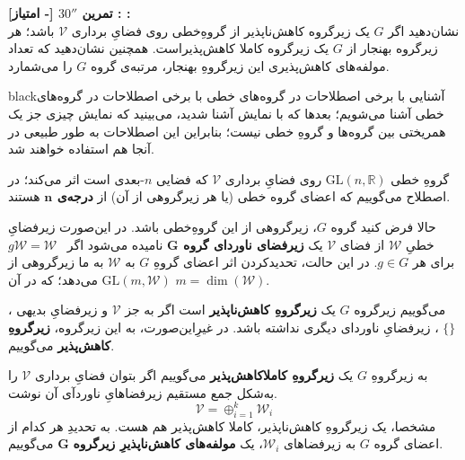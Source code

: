 \documentclass{article}
\newenvironment{exercise}[3][\unskip]{%
	\par
	\noindent
	\textbf{تمرین
		#1
		[- امتیاز] 
		\def\temp{#3}\ifx\temp\empty
		: 
		\else
		: #3 \vspace{0.5em} \\ \noindent
		\fi
}}{}
\begin{document}
	
	\begin{exercise}[$30''$]{}{}
		نشان‌دهید اگر $G$ یک زیرگروه ‌کاهش‌ناپذیر از گروهِ‌خطی روی فضایِ برداری 
		$\mathcal{V}$
		باشد؛ هر زیرگروه بهنجار از 
		$G$ یک زیرگروه کاملا کاهش‌پذیراست. همچنین نشان‌دهید که تعداد مولفه‌های کاهش‌پذیری این زیرگروهِ بهنجار، مرتبه‌ی گروه
		$G$
		را می‌شمارد.
		
	\end{exercise}
	
	\begin{boxes}{black}{آشنایی با برخی اصطلاحات در گروه‌های خطی}
		با برخی اصطلاحات در گروه‌های خطی آشنا می‌شویم؛ بعدها که با نمایش آشنا شدید، می‌بینید که نمایش چیزی جز یک همریختی بین گروه‌ها و گروهِ خطی نیست؛ بنابراین این اصطلاحات به طور طبیعی در آنجا هم استفاده خواهند شد.
		
		گروهِ خطی 
		$\text{GL}(n,\mathbb{R})$
		روی فضایِ برداری 
		$\mathcal{V}$
		که فضایی 
		$n$-بعدی 
		است اثر می‌کند؛ در اصطلاح می‌گوییم که اعضای گروه خطی (یا هر زیرگروهی از آن) از 
		\textbf
		{درجه‌ی
			$\mathbf{n}$} هستند.
		
		حالا فرض ‌کنید گروه
		$G$، زیرگروهی از این گروهِ‌خطی باشد. در این‌صورت زیرفضایِ خطیِ 
		$\mathcal{W}
		$
		از فضای 
		$\mathcal{V}$ یک 
		\textbf{زیرفضای ناوردای گروه 
			$\mathbf{G}$
		}
		نامیده می‌شود اگر\
		$g\mathcal{W} = \mathcal{W}$
		برای هر 
		$g\in G$.
		در این حالت، تحدید‌کردن اثر اعضای گروهِ
		$G$ به 
		$\mathcal{W}$
		به ما زیرگروهی از 
		$\text{GL}(m,\mathcal{W})$
		می‌دهد؛ که در آن 
		$m = \dim(\mathcal{W})$.
		
		می‌گوییم زیرگروه $G$ یک \textbf{زیرگروه‌ِ کاهش‌ناپذیر
		} است اگر به جز 
		$\mathcal{V}$
		و زیرفضایِ بدیهی
		،
		$\{\}$
		،
		زیرفضایِ ناوردای دیگری نداشته باشد.
		در غیرِاین‌صورت، به این زیرگروه، \textbf{زیرگروهِ کاهش‌پذیر
		} می‌گوییم.
		
		به‌ زیرگروهِ 
		$G$
		یک \textbf{زیرگروهِ کاملا‌کاهش‌پذیر
		}می‌گوییم اگر بتوان فضایِ برداری 
		$\mathcal{V}$
		را به‌شکل جمع مستقیم زیرفضاهایِ ناوردآی آن نوشت.
		\[
		\mathcal{V} = \oplus_{i=1}^k \mathcal{W}_i
		\]
		مشخصا، یک زیرگروهِ کاهش‌ناپذیر، کاملا کاهش‌پذیر هم هست. به تحدیدِ هر کدام از اعضای گروه $G$ به زیرفضاهای 
		$\mathcal{W}_i$،
		یک \textbf{مولفه‌های کاهش‌ناپذیرِ زیرگروه
		}
		$\mathbf{G}$
		می‌گوییم.
	\end{boxes}
	
	
	
	
	\vspace{1em}
\end{document}
